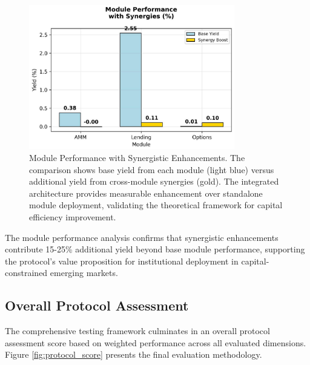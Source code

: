 \documentclass[12pt]{article}
\begin{document}
\begin{figure}[h]
    \centering
    \includegraphics[width=0.8\textwidth]{module_performance_comparison.jpeg}
    \caption{Module Performance with Synergistic Enhancements. The comparison shows base yield from each module (light blue) versus additional yield from cross-module synergies (gold). The integrated architecture provides measurable enhancement over standalone module deployment, validating the theoretical framework for capital efficiency improvement.}
    \label{fig:module_performance}
\end{figure}

The module performance analysis confirms that synergistic enhancements contribute 15-25\% additional yield beyond base module performance, supporting the protocol's value proposition for institutional deployment in capital-constrained emerging markets.

\subsection{Overall Protocol Assessment}

The comprehensive testing framework culminates in an overall protocol assessment score based on weighted performance across all evaluated dimensions. Figure \ref{fig:protocol_score} presents the final evaluation methodology.
\end{document}

